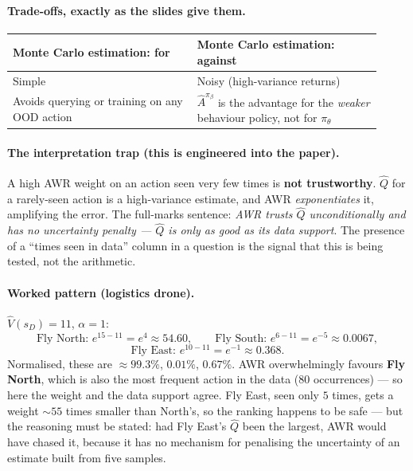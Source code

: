 \documentclass[11pt,a4paper]{article}
\begin{document}
\paragraph{Trade-offs, exactly as the slides give them.}
\begin{center}
\begin{tabular}{@{}p{0.46\linewidth}p{0.46\linewidth}@{}}
\toprule
\textbf{Monte Carlo estimation: for} & \textbf{Monte Carlo estimation: against} \\
\midrule
Simple & Noisy (high-variance returns) \\
Avoids querying or training on any OOD action & $\hat A^{\pi_\beta}$ is the advantage for the \emph{weaker} behaviour policy, not for $\pi_\theta$ \\
\bottomrule
\end{tabular}
\end{center}

\paragraph{The interpretation trap (this is engineered into the paper).} A
high AWR weight on an action seen very few times is \textbf{not trustworthy}.
$\hat Q$ for a rarely-seen action is a high-variance estimate, and AWR
\emph{exponentiates} it, amplifying the error. The full-marks sentence:
\emph{AWR trusts $\hat Q$ unconditionally and has no uncertainty penalty ---
$\hat Q$ is only as good as its data support}. The presence of a
``times seen in data'' column in a question is the signal that this is being
tested, not the arithmetic.

\paragraph{Worked pattern (logistics drone).} $\hat V(s_D)=11$, $\alpha=1$:
\[
\text{Fly North: } e^{15-11}=e^{4}\approx 54.60,\qquad
\text{Fly South: } e^{6-11}=e^{-5}\approx 0.0067,
\]
\[
\text{Fly East: } e^{10-11}=e^{-1}\approx 0.368 .
\]
Normalised, these are $\approx 99.3\%$, $0.01\%$, $0.67\%$. AWR
overwhelmingly favours \textbf{Fly North}, which is also the most frequent
action in the data ($80$ occurrences) --- so here the weight and the data
support agree. Fly East, seen only $5$ times, gets a weight $\sim 55$ times
smaller than North's, so the ranking happens to be safe --- but the reasoning
must be stated: had Fly East's $\hat Q$ been the largest, AWR would have
chased it, because it has no mechanism for penalising the uncertainty of an
estimate built from five samples.
\end{document}
